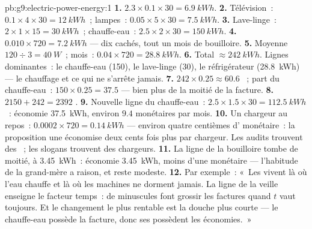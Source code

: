 \begin{solution}{pb:g9:electric-power-energy:1}
\textbf{1.} $2.3 \times 0.1 \times 30 = \qty{6.9}{kWh}$.
\textbf{2.} Télévision~: $0.1 \times 4 \times 30 = \qty{12}{kWh}$~;
lampes~: $0.05 \times 5 \times 30 = \qty{7.5}{kWh}$.
\textbf{3.} Lave-linge~: $2 \times 1 \times 15 = \qty{30}{kWh}$~;
chauffe-eau~: $2.5 \times 2 \times 30 = \qty{150}{kWh}$.
\textbf{4.} $0.010 \times 720 = \qty{7.2}{kWh}$ --- dix 
cachés, tout un mois de bouilloire.
\textbf{5.} Moyenne $120 \div 3 = \qty{40}{W}$~; mois~:
$0.04 \times 720 = \qty{28.8}{kWh}$.
\textbf{6.} Total $\approx \qty{242}{kWh}$. Lignes dominantes~: le
chauffe-eau (\qty{150}{}), le lave-linge (\qty{30}{}), le
réfrigérateur (\qty{28.8}{kWh}) --- le chauffage et ce qui ne
s'arrête jamais.
\textbf{7.} $242 \times 0.25 \approx 60.6$ ~; part du
chauffe-eau~: $150 \times 0.25 = 37.5$ --- bien plus de la moitié de
la facture.
\textbf{8.} $2150 + 242 = 2392$ .
\textbf{9.} Nouvelle ligne du chauffe-eau~:
$2.5 \times 1.5 \times 30 = \qty{112.5}{kWh}$~: économie
\qty{37.5}{kWh}, environ $9.4$  monétaires par mois.
\textbf{10.} Un chargeur au repos~:
$0.0002 \times 720 = \qty{0.14}{kWh}$ --- environ quatre centièmes
d' monétaire~: la proposition une économise deux cents fois plus
par chargeur. Les audits trouvent des ~; les slogans trouvent
des chargeurs.
\textbf{11.} La ligne de la bouilloire tombe de moitié, à
\qty{3.45}{kWh}~: économie \qty{3.45}{kWh}, moins d'une 
monétaire --- l'habitude de la grand-mère a raison, et reste modeste.
\textbf{12.} Par exemple~: «~Les  vivent là où l'eau
chauffe et là où les machines ne dorment jamais. La ligne de la veille
enseigne le facteur temps~: de minuscules  font grossir les
factures quand $t$ vaut toujours. Et le changement le plus rentable
est la douche plus courte --- le chauffe-eau possède la facture, donc
ses  possèdent les économies.~»
\end{solution}
